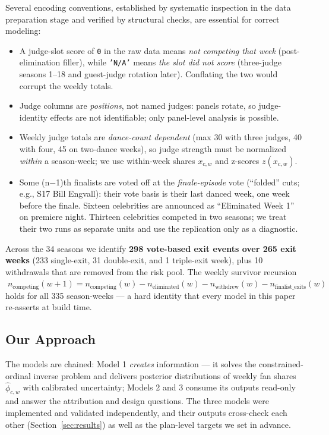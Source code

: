 \documentclass[11pt]{article}
\begin{document}
Several encoding conventions, established by systematic inspection in the data
preparation stage and verified by structural checks, are essential for correct
modeling:

\begin{itemize}[leftmargin=2em]
\item A judge-slot score of \texttt{0} in the raw data means \emph{not competing
that week} (post-elimination filler), while \texttt{'N/A'} means \emph{the slot did
not score} (three-judge seasons 1--18 and guest-judge rotation later). Conflating
the two would corrupt the weekly totals.
\item Judge columns are \emph{positions}, not named judges: panels rotate, so
judge-identity effects are not identifiable; only panel-level analysis is possible.
\item Weekly judge totals are \emph{dance-count dependent} (max 30 with three
judges, 40 with four, 45 on two-dance weeks), so judge strength must be normalized
\emph{within} a season-week; we use within-week shares $x_{c,w}$ and z-scores
$z(x_{c,w})$.
\item Some (n$-$1)th finalists are voted off at the \emph{finale-episode} vote
(``folded'' cuts; e.g., S17 Bill Engvall): their vote basis is their last danced
week, one week before the finale. Sixteen celebrities are announced as
``Eliminated Week 1'' on premiere night. Thirteen celebrities competed in two
seasons; we treat their two runs as separate units and use the replication only
as a diagnostic.
\end{itemize}

Across the 34 seasons we identify \textbf{298 vote-based exit events over 265 exit
weeks} (233 single-exit, 31 double-exit, and 1 triple-exit week), plus 10
withdrawals that are removed from the risk pool. The weekly survivor recursion
$\;n_{\text{competing}}(w{+}1) = n_{\text{competing}}(w) -
n_{\text{eliminated}}(w) - n_{\text{withdrew}}(w) - n_{\text{finalist\_exits}}(w)\;$
holds for all 335 season-weeks --- a hard identity that every model in this paper
re-asserts at build time.

\subsection{Our Approach}
\label{sec:approach}

The models are chained: Model 1 \emph{creates} information --- it solves the
constrained-ordinal inverse problem and delivers posterior distributions of weekly
fan shares $\hat\phi_{c,w}$ with calibrated uncertainty; Models 2 and 3 consume its
outputs read-only and answer the attribution and design questions. The three models
were implemented and validated independently, and their outputs cross-check each
other (Section~\ref{sec:results}) as well as the plan-level targets we set in
advance.
\end{document}
